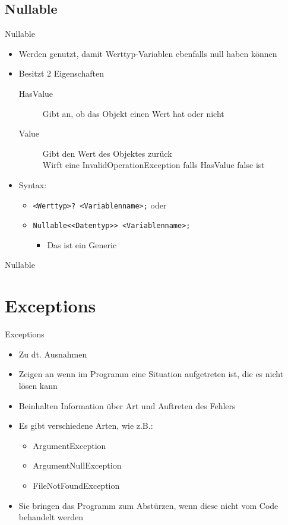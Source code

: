 \subsection{Nullable}
\begin{frame}{Nullable}
	\begin{itemize}
		\item Werden genutzt, damit Werttyp-Variablen ebenfalls \alert{null} haben können
		\item Besitzt 2 Eigenschaften
		\begin{description}
			\item[HasValue] Gibt an, ob das Objekt einen Wert hat oder nicht
			\item[Value] Gibt den Wert des Objektes zurück\\ Wirft eine InvalidOperationException falls HasValue \alert{false} ist 
		\end{description}
		\item Syntax:
		\begin{itemize}
			\item \texttt{\alert{<Werttyp>}? \alert{<Variablenname>};} oder
			\item \texttt{Nullable<\alert{<Datentyp>}> \alert{<Variablenname>};}
			\begin{itemize}
				\item Das ist ein Generic
			\end{itemize}
		\end{itemize}
	\end{itemize}
\end{frame}

\begin{frame}{Nullable}
		
\end{frame}

\section{Exceptions}
\begin{frame}{Exceptions}
	\begin{itemize}
		\item Zu dt. Ausnahmen
		\item Zeigen an wenn im Programm eine Situation aufgetreten ist, die es nicht lösen kann
		\item Beinhalten Information über Art und Auftreten des Fehlers
		\item Es gibt verschiedene Arten, wie z.B.:
		\begin{itemize} 
			\item ArgumentException
			\item ArgumentNullException	
			\item FileNotFoundException
		\end{itemize}
		\item Sie bringen das Programm zum Abstürzen, wenn diese nicht vom Code behandelt werden
	\end{itemize}
\end{frame}

